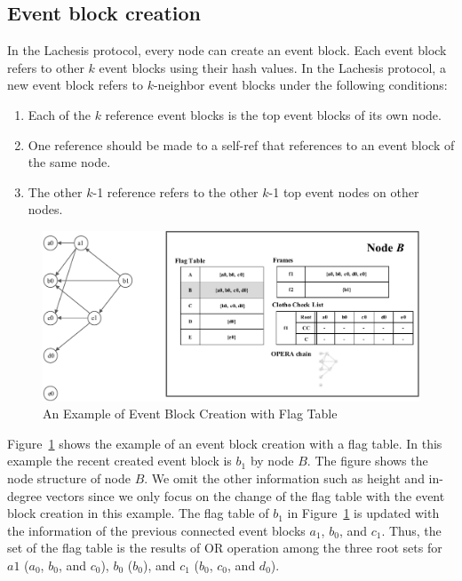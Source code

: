\documentclass{article}
\begin{document}
\subsection{Event block creation}
In the Lachesis protocol, every node can create an event block. Each event block refers to other $k$ event blocks using their hash values. In the Lachesis protocol, a new event block refers to $k$-neighbor event blocks under the following conditions:

\begin{enumerate}
\item Each of the $k$ reference event blocks is the top event blocks of its own node.
\item One reference should be made to a self-ref that references to an event block of the same node. 
\item The other $k$-1 reference refers to the other $k$-1 top event nodes on other nodes.
\end{enumerate}

\newpage

\begin{figure}[H] \centering  
\includegraphics[width=1.0\textwidth]{Ex_eventblock.pdf}
\caption{An Example of Event Block Creation with Flag Table}
\label{fig:ex_ebc}
\end{figure}

Figure~\ref{fig:ex_ebc} shows the example of an event block creation with a flag table. In this example the recent created event block is $b_1$ by node $B$. The figure shows the node structure of node $B$. We omit the other information such as height and in-degree vectors since we only focus on the change of the flag table with the event block creation in this example. The flag table of $b_1$ in Figure~\ref{fig:ex_ebc} is updated with the information of the previous connected event blocks $a_1$, $b_0$, and $c_1$. Thus, the set of the flag table is the 
results of OR operation among the three root sets for $a1$ ($a_0$, $b_0$, and $c_0$), $b_0$ ($b_0$), and $c_1$ ($b_0$, $c_0$, and $d_0$). 
\end{document}
